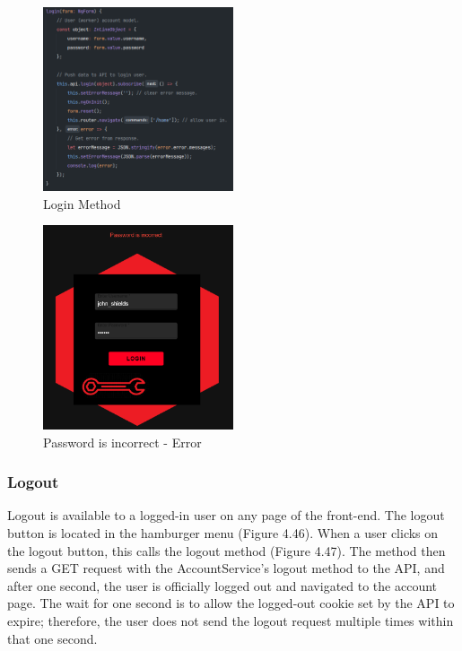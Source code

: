 \begin{figure}[H]
    \caption{Login Method}
    \label{image:loginMethod}
    \centering
    \includegraphics[width=0.5\textwidth]{images/repota/account_pages/login.png}
\end{figure}

\begin{figure}[H]
    \caption{Password is incorrect - Error}
    \label{image:failedLogin}
    \centering
    \includegraphics[width=0.5\textwidth]{images/repota/UI/failed-login.png}
\end{figure}

\subsubsection{Logout}
Logout is available to a logged-in user on any page of the front-end. The logout button is located in the hamburger menu (Figure 4.46). When a user clicks on the logout button, this calls the logout method (Figure 4.47). The method then sends a GET request with the AccountService's logout method to the API, and after one second, the user is officially logged out and navigated to the account page. The wait for one second is to allow the logged-out cookie set by the API to expire; therefore, the user does not send the logout request multiple times within that one second.

